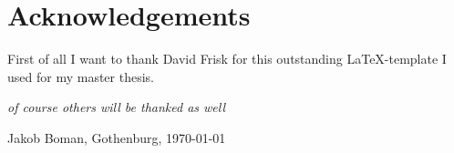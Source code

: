 \thispagestyle{plain}			%
\section*{Acknowledgements}

First of all I want to thank David Frisk for this outstanding \LaTeX-template I used for my master thesis.

\textit{of course others will be thanked as well}




\vspace{1.5cm}
\hfill
Jakob Boman, Gothenburg, \today

\newpage				%
\thispagestyle{empty}
\mbox{}